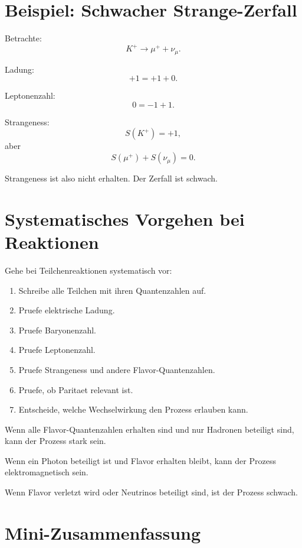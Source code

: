 \section{Beispiel: Schwacher Strange-Zerfall}

\begin{examplebox}
Betrachte:
\[
    K^+ \rightarrow \mu^+ + \nu_\mu.
\]

Ladung:
\[
    +1 = +1 + 0.
\]

Leptonenzahl:
\[
    0 = -1 + 1.
\]

Strangeness:
\[
    S(K^+)=+1,
\]
aber
\[
    S(\mu^+)+S(\nu_\mu)=0.
\]

Strangeness ist also nicht erhalten.
Der Zerfall ist schwach.
\end{examplebox}

\section{Systematisches Vorgehen bei Reaktionen}

\begin{examtipbox}
Gehe bei Teilchenreaktionen systematisch vor:

\begin{enumerate}
    \item Schreibe alle Teilchen mit ihren Quantenzahlen auf.
    \item Pruefe elektrische Ladung.
    \item Pruefe Baryonenzahl.
    \item Pruefe Leptonenzahl.
    \item Pruefe Strangeness und andere Flavor-Quantenzahlen.
    \item Pruefe, ob Paritaet relevant ist.
    \item Entscheide, welche Wechselwirkung den Prozess erlauben kann.
\end{enumerate}
\end{examtipbox}

\begin{conceptbox}
Wenn alle Flavor-Quantenzahlen erhalten sind und nur Hadronen beteiligt sind, kann
der Prozess stark sein.

Wenn ein Photon beteiligt ist und Flavor erhalten bleibt, kann der Prozess
elektromagnetisch sein.

Wenn Flavor verletzt wird oder Neutrinos beteiligt sind, ist der Prozess schwach.
\end{conceptbox}

\section{Mini-Zusammenfassung}

